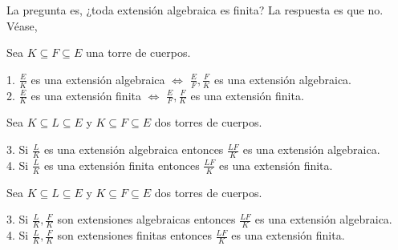 La pregunta es, ¿toda extensión algebraica es finita? La respuesta es que no. Véase, \cite{link1}


\begin{proposition}
	Sea $K \subseteq F \subseteq E$ una torre de cuerpos. 
	
	1. $\frac{E}{K}$ es una extensión algebraica $\iff$ $\frac{E}{F},\frac{F}{K}$ es una extensión algebraica. \\
	2. $\frac{E}{K}$ es una extensión finita $\iff$ $\frac{E}{F},\frac{F}{K}$ es una extensión finita. 
	
	Sea $K \subseteq L \subseteq E$ y $K \subseteq F \subseteq E$ dos torres de cuerpos.
	
	3. Si $\frac{L}{K}$ es una extensión algebraica entonces $\frac{LF}{K}$ es una extensión algebraica. \\
	4. Si $\frac{L}{K}$ es una extensión finita entonces $\frac{LF}{K}$ es una extensión finita.
	
	Sea $K \subseteq L \subseteq E$ y $K \subseteq F \subseteq E$ dos torres de cuerpos.
	
	3. Si $\frac{L}{K},\frac{F}{K}$ son extensiones algebraicas entonces $\frac{LF}{K}$ es una extensión algebraica. \\
	4. Si $\frac{L}{K},\frac{F}{K}$ son extensiones finitas entonces $\frac{LF}{K}$ es una extensión finita. \\
\end{proposition}

